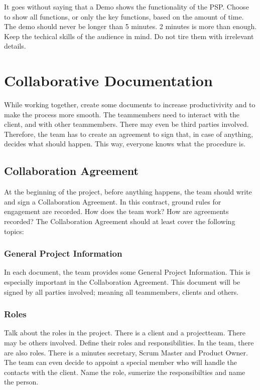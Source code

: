 \documentclass[10pt]{report}
\begin{document}
\noindent It goes without saying that a Demo shows the functionality of the PSP. Choose to show all functions, or only the key functions, based on the amount of time. The demo should never be longer than 5 minutes. 2 minutes is more than enough. Keep the techical skills of the audience in mind. Do not tire them with irrelevant details.

\newpage

\chapter{Collaborative Documentation}
\thispagestyle{fancy}

While working together, create some documents to increase productivivity and to make the process more smooth. The teammembers need to interact with the client, and with other teammembers. There may even be third parties involved. Therefore, the team has to create an agreement to sign that, in case of anything, decides what should happen. This way, everyone knows what the procedure is.

\medskip
\minitoc

\newpage

\section{Collaboration Agreement}

At the beginning of the project, before anything happens, the team should write and sign a Collaboration Agreement. In this contract, ground rules for engagement are recorded. How does the team work? How are agreements recorded? The Collaboration Agreement should at least cover the following topics:

\subsection{General Project Information}

In each document, the team provides some General Project Information. This is especially important in the Collaboration Agreement. This document will be signed by all parties involved; meaning all teammembers, clients and others.

\subsection{Roles}

Talk about the roles in the project. There is a client and a projectteam. There may be others involved. Define their roles and responsibilities. In the team, there are also roles. There is a minutes secretary, Scrum Master and Product Owner. The team can even decide to appoint a special member who will handle the contacts with the client. Name the role, sumerize the responsibilties and name the person.
\end{document}
